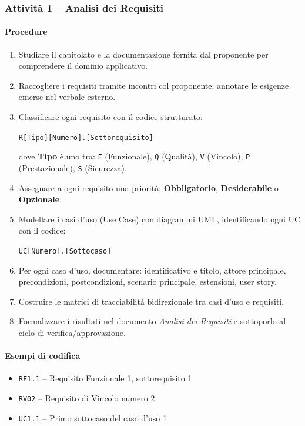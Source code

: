 \documentclass[a4paper, 11pt, oneside]{scrartcl}
\begin{document}
\subsubsection{Attività 1 – Analisi dei Requisiti{\scriptsize{}}}

\paragraph{Procedure}
\begin{enumerate}
    \item Studiare il capitolato{\scriptsize{}} e la documentazione fornita dal proponente per comprendere il dominio applicativo.
    \item Raccogliere i requisiti tramite incontri col proponente; annotare le esigenze emerse nel verbale esterno.
    \item Classificare ogni requisito con il codice strutturato:
          \begin{center}
              \texttt{R[Tipo][Numero].[Sottorequisito]}
          \end{center}
          dove \textbf{Tipo} è uno tra: \texttt{F} (Funzionale), \texttt{Q} (Qualità), \texttt{V} (Vincolo), \texttt{P} (Prestazionale), \texttt{S} (Sicurezza).
    \item Assegnare a ogni requisito una priorità: \textbf{Obbligatorio}, \textbf{Desiderabile} o \textbf{Opzionale}.
    \item Modellare i casi d'uso (Use Case) con diagrammi UML{\scriptsize{}}, identificando ogni UC con il codice:
          \begin{center}
              \texttt{UC[Numero].[Sottocaso]}
          \end{center}
    \item Per ogni caso d'uso, documentare: identificativo e titolo, attore principale, precondizioni, postcondizioni, scenario principale, estensioni, user story.
    \item Costruire le matrici di tracciabilità bidirezionale tra casi d'uso e requisiti.
    \item Formalizzare i risultati nel documento \emph{Analisi dei Requisiti}{\scriptsize{}} e sottoporlo al ciclo di verifica/approvazione.
\end{enumerate}

\paragraph{Esempi di codifica}
\begin{itemize}
    \item \texttt{RF1.1} – Requisito Funzionale 1, sottorequisito 1
    \item \texttt{RV02} – Requisito di Vincolo numero 2
    \item \texttt{UC1.1} – Primo sottocaso del caso d'uso 1
\end{itemize}
\end{document}
